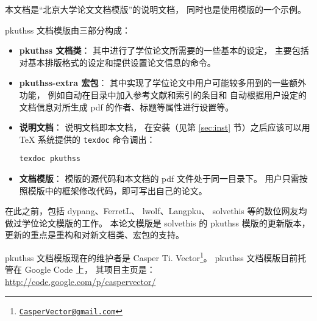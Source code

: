 %
%
%
%
%


本文档是“北京大学论文文档模版”的说明文档，
同时也是使用模版的一个示例。

pkuthss 文档模版由三部分构成：
\begin{itemize}
	\item \textbf{pkuthss 文档类}：
		其中进行了学位论文所需要的一些基本的设定，
		主要包括对基本排版格式的设定和提供设置论文信息的命令。
	\item \textbf{pkuthss-extra 宏包}：
		其中实现了学位论文中用户可能较多用到的一些额外功能，
		例如自动在目录中加入参考文献和索引的条目和%
		自动根据用户设定的文档信息对所生成 pdf 的作者、标题等属性进行设置等。
	\item \textbf{说明文档}：
		说明文档即本文档，
		在安装（见第 \ref{sec:inst} 节）之后应该可以用 \TeX{} 系统提供的
		\verb|texdoc| 命令调出：
\begin{Verbatim}[frame=single]
texdoc pkuthss
\end{Verbatim}
	\item \textbf{文档模版}：
		模版的源代码和本文档的 pdf 文件处于同一目录下。
		用户只需按照模版中的框架修改代码，即可写出自己的论文。
\end{itemize}

在此之前，包括 dypang\supercite{dypang}、FerretL\supercite{FerretL}、%
lwolf\supercite{lwolf}、Langpku\supercite{Langpku}、%
solvethis\supercite{solvethis} 等的数位网友均做过学位论文模版的工作。
本论文模版是 solvethis 的 pkuthss 模版的更新版本，
更新的重点是重构和对新文档类、宏包的支持。

pkuthss 文档模版现在的维护者是 Casper Ti. Vector\footnote%
{\href{mailto:CasperVector@gmail.com}{\texttt{CasperVector@gmail.com}}}。%
pkuthss 文档模版目前托管在 Google Code 上，
其项目主页是：\\
\hspace*{\parindent}\url{http://code.google.com/p/caspervector/}

